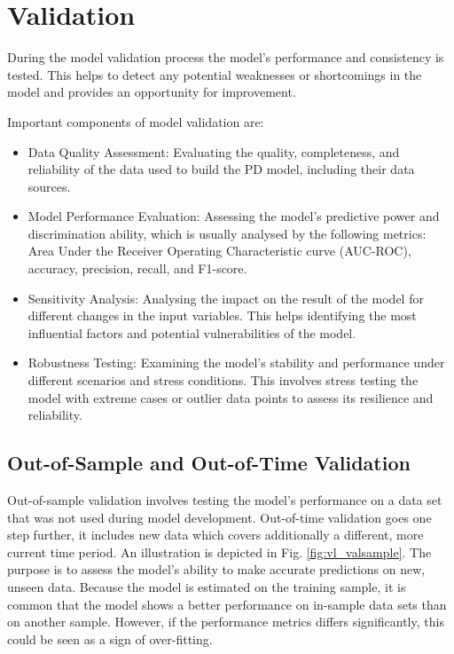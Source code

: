 \chapter{Validation}
During the model validation process the model's performance and consistency is tested. This helps to detect any potential weaknesses or shortcomings in the model and provides an opportunity for improvement.

Important components of model validation are:

\begin{itemize}
  \item Data Quality Assessment: Evaluating the quality, completeness, and reliability of the data used to build the PD model, including their data sources.  
  \item Model Performance Evaluation: Assessing the model's predictive power and discrimination ability, which is usually analysed by the following metrics: Area Under the Receiver Operating Characteristic curve (AUC-ROC), accuracy, precision, recall, and F1-score. 
  \item Sensitivity Analysis: Analysing the impact on the result of the model for different changes in the input variables. This helps identifying the most influential factors and potential vulnerabilities of the model.
  \item Robustness Testing: Examining the model's stability and performance under different scenarios and stress conditions. This involves stress testing the model with extreme cases or outlier data points to assess its resilience and reliability.
\end{itemize}

\section{Out-of-Sample and Out-of-Time Validation}
Out-of-sample validation involves testing the model's performance on a data set that was not used during model development. Out-of-time validation goes one step further, it includes new data which covers additionally a different, more current time period. An illustration is depicted in Fig. \ref{fig:vl_valsample}. The purpose is to assess the model's ability to make accurate predictions on new, unseen data. Because the model is estimated on the training sample, it is common that the model shows a better performance on in-sample data sets than on another sample. However, if the performance metrics differs significantly, this could be seen as a sign of over-fitting. 

